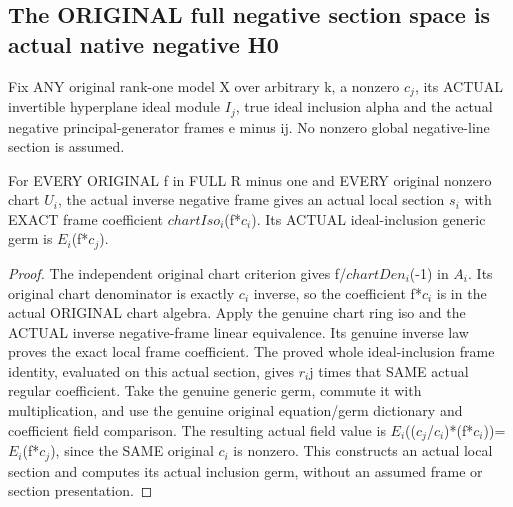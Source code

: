 \subsection{The ORIGINAL full negative section space is actual native negative H0}
Fix ANY original rank-one model X over arbitrary k, a nonzero $c_j$,
its ACTUAL invertible hyperplane ideal module $I_j$, true ideal inclusion
alpha and the actual negative principal-generator frames e minus ij.
No nonzero global negative-line section is assumed.

\begin{theorem}
\label{thm:seven-native-original-negative-local-sections}
\leanok
For EVERY ORIGINAL f in FULL R minus one and EVERY original nonzero
chart $U_i$, the actual inverse negative frame gives an actual local
section $s_i$ with EXACT frame coefficient $chartIso_i$(f*$c_i$). Its ACTUAL
ideal-inclusion generic germ is $E_i$(f*$c_j$).
\end{theorem}
\begin{proof}
The independent original chart criterion gives f/$chartDen_i$(-1) in $A_i$.
Its original chart denominator is exactly $c_i$ inverse, so the coefficient
f*$c_i$ is in the actual ORIGINAL chart algebra. Apply the genuine chart
ring iso and the ACTUAL inverse negative-frame linear equivalence.
Its genuine inverse law proves the exact local frame coefficient.
The proved whole ideal-inclusion frame identity, evaluated on this
actual section, gives $r_i$j times that SAME actual regular coefficient.
Take the genuine generic germ, commute it with multiplication, and use
the genuine original equation/germ dictionary and coefficient field
comparison. The resulting actual field value is
$E_i$(($c_j$/$c_i$)*(f*$c_i$))=$E_i$(f*$c_j$), since the SAME original $c_i$ is nonzero.
This constructs an actual local section and computes its actual inclusion
germ, without an assumed frame or section presentation.
\end{proof}

